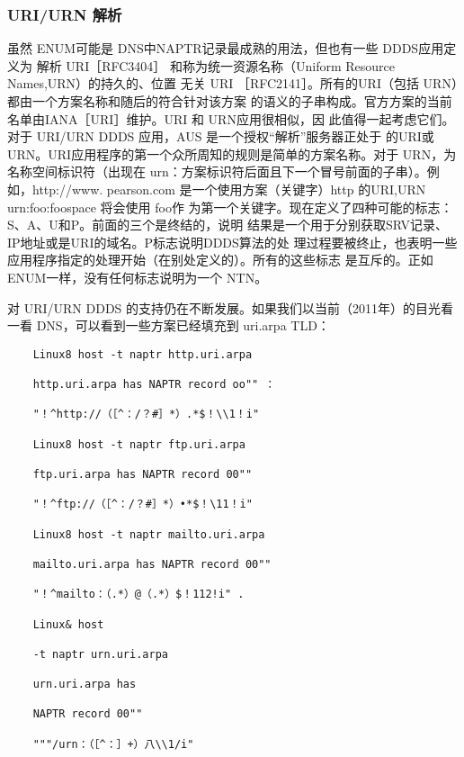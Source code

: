 \subsubsection{ URI/URN 解析}

虽然 ENUM可能是 DNS中NAPTR记录最成熟的用法，但也有一些 DDDS应用定义为
解析 URI［RFC3404］ 和称为统一资源名称（Uniform Resource Names,URN）的持久的、位置
无关 URI ［RFC2141］。所有的URI（包括 URN）都由一个方案名称和随后的符合针对该方案
的语义的子串构成。官方方案的当前名单由IANA［URI］维护。URI 和 URN应用很相似，因
此值得一起考虑它们。对于 URI/URN DDDS 应用，AUS 是一个授权“解析”服务器正处于
的URI或URN。URI应用程序的第一个众所周知的规则是简单的方案名称。对于 URN，为
名称空间标识符（出现在 urn：方案标识符后面且下一个冒号前面的子串）。例如，http://www.
pearson.com 是一个使用方案（关键字）http 的URI,URN urn:foo:foospace 将会使用 foo作
为第一个关键字。现在定义了四种可能的标志：S、A、U和P。前面的三个是终结的，说明
结果是一个用于分别获取SRV记录、IP地址或是URI的域名。P标志说明DDDS算法的处
理过程要被终止，也表明一些应用程序指定的处理开始（在别处定义的）。所有的这些标志
是互斥的。正如 ENUM一样，没有任何标志说明为一个 NTN。

对 URI/URN DDDS 的支持仍在不断发展。如果我们以当前（2011年）的目光看一看
DNS，可以看到一些方案已经填充到 uri.arpa TLD：

\begin{verbatim}
    Linux8 host -t naptr http.uri.arpa
    
    http.uri.arpa has NAPTR record oo"" ：
    
    "！^http://（［^：/？#］*）.*$！\\1！i"
    
    Linux8 host -t naptr ftp.uri.arpa
    
    ftp.uri.arpa has NAPTR record 00""
    
    "！^ftp://（［^：/？#］*）•*$！\11！i"
    
    Linux8 host -t naptr mailto.uri.arpa
    
    mailto.uri.arpa has NAPTR record 00""
    
    "！^mailto：（.*）@（.*）$！112!i" .
    
    Linux& host
    
    -t naptr urn.uri.arpa
    
    urn.uri.arpa has
    
    NAPTR record 00""
    
    """/urn：（［^：］+）八\\1/i"
\end{verbatim}

